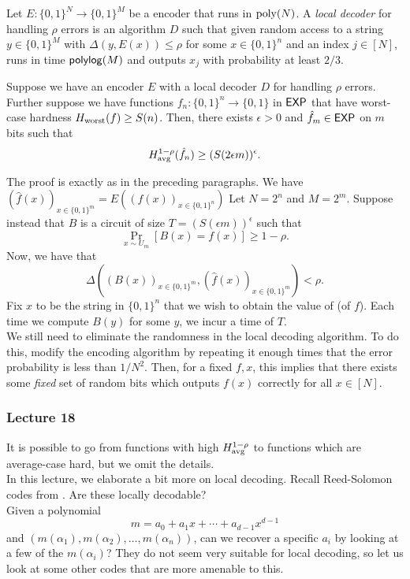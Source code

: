 		\begin{fdef}
			Let $E : \{0,1\}^N \to \{0,1\}^M$ be a encoder that runs in $\operatorname{poly}(N)$. A \emph{local decoder} for handling $\rho$ errors is an algorithm $D$ such that given random access to a string $y \in \{0,1\}^M$ with $\Delta(y,E(x)) \le \rho$ for some $x \in \{0,1\}^n$ and an index $j \in [N]$, runs in time $\mathsf{polylog}(M)$ and outputs $x_j$ with probability at least $2/3$.
		\end{fdef}

		\begin{ftheo}
			Suppose we have an encoder $E$ with a local decoder $D$ for handling $\rho$ errors. Further suppose we have functions $f_n : \{0,1\}^n \to \{0,1\}$ in $\mathsf{EXP}$ that have worst-case hardness $H_{\text{worst}}(f) \ge S(n)$. Then, there exists $\epsilon > 0$ and $\hat{f}_{m} \in \mathsf{EXP}$ on $m$ bits such that
			\[ H_{\text{avg}}^{1-\rho}(\hat{f}_n) \ge (S (2 \epsilon m))^{\epsilon}. \]
		\end{ftheo}
		The proof is exactly as in the preceding paragraphs. We have $(\hat{f}(x))_{x \in \{0,1\}^m} = E( (f(x))_{x \in \{0,1\}^n} )$ Let $N = 2^n$ and $M = 2^m$. Suppose instead that $B$ is a circuit of size  $T = (S(\epsilon m))^\epsilon$ such that
		\[ \Pr_{x \sim U_m}[B(x) = f(x)] \ge 1 - \rho. \]
		Now, we have that
		\[ \Delta( ( B(x) )_{x \in \{0,1\}^m} , ( \hat{f}(x) )_{x \in \{0,1\}^m} ) < \rho. \]
		Fix $x$ to be the string in $\{0,1\}^n$ that we wish to obtain the value of (of $f$). Each time we compute $B(y)$ for some $y$, we incur a time of $T$.\\
		We still need to eliminate the randomness in the local decoding algorithm. To do this, modify the encoding algorithm by repeating it enough times that the error probability is less than $1/N^2$. Then, for a fixed $f,x$, this implies that there exists some \emph{fixed} set of random bits which outputs $f(x)$ correctly for all $x \in [N]$.

	\subsubsection{Lecture 18}

		It is possible to go from functions with high $H_{\text{avg}}^{1-\rho}$ to functions which are average-case hard, but we omit the details.\\
		In this lecture, we elaborate a bit more on local decoding. Recall Reed-Solomon codes from . Are these locally decodable?\\
		Given a polynomial
		\[ m = a_0 + a_1x + \cdots + a_{d-1}x^{d-1} \]
		and $(m(\alpha_1),m(\alpha_2),\ldots,m(\alpha_n))$, can we recover a specific $a_i$ by looking at a few of the $m(\alpha_i)$? They do not seem very suitable for local decoding, so let us look at some other codes that are more amenable to this.


